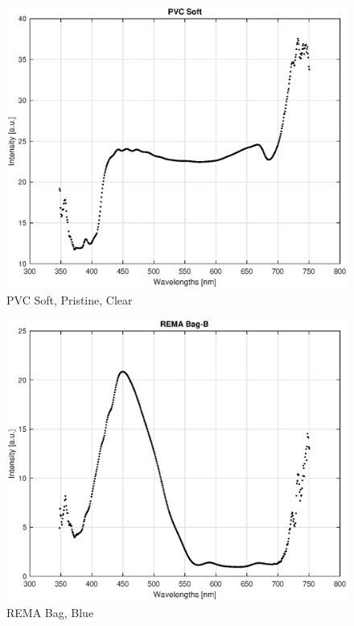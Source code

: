 \begin{appendices}
\begin{figure}
    \centering
    \includegraphics[width = 12cm]{Images/appendix/pvc-soft-pristine-clear.eps}
    \caption[$\; \:$PVC Soft]{PVC Soft, Pristine, Clear}
    \label{fig:pvc-clear}
\end{figure}

\begin{figure}
    \centering
    \includegraphics[width = 12cm]{Images/appendix/remablue.eps}
    \caption[$\; \:$REMA Bag, Blue]{REMA Bag, Blue}
    \label{fig:remablue}
\end{figure}


\end{appendices}
